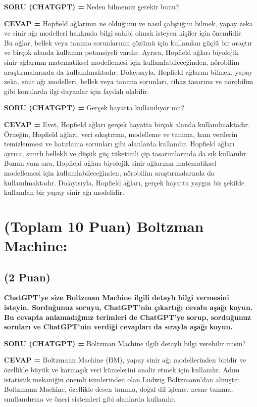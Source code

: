 \documentclass[11pt]{article}
\begin{document}
\textbf{SORU (CHATGPT) =} Neden bilmemiz gerekir bunu? 

\textbf{CEVAP =} Hopfield ağlarının ne olduğunu ve nasıl çalıştığını bilmek, yapay zeka ve sinir ağı modelleri hakkında bilgi sahibi olmak isteyen kişiler için önemlidir. Bu ağlar, bellek veya tanıma sorunlarının çözümü için kullanılan güçlü bir araçtır ve birçok alanda kullanım potansiyeli vardır. Ayrıca, Hopfield ağları biyolojik sinir ağlarının matematiksel modellemesi için kullanılabileceğinden, nörobilim araştırmalarında da kullanılmaktadır. Dolayısıyla, Hopfield ağlarını bilmek, yapay zeka, sinir ağı modelleri, bellek veya tanıma sorunları, cihaz tasarımı ve nörobilim gibi konularda ilgi duyanlar için faydalı olabilir.

\textbf{SORU (CHATGPT) =} Gerçek hayatta kullanılıyor mu?

\textbf{CEVAP =} Evet, Hopfield ağları gerçek hayatta birçok alanda kullanılmaktadır. Örneğin, Hopfield ağları, veri sıkıştırma, modelleme ve tanıma, ham verilerin temizlenmesi ve hatırlama sorunları gibi alanlarda kullanılır. Hopfield ağları ayrıca, sınırlı bellekli ve düşük güç tüketimli çip tasarımlarında da sık kullanılır. Bunun yanı sıra, Hopfield ağları biyolojik sinir ağlarının matematiksel modellemesi için kullanılabileceğinden, nörobilim araştırmalarında da kullanılmaktadır. Dolayısıyla, Hopfield ağları, gerçek hayatta yaygın bir şekilde kullanılan bir yapay sinir ağı modelidir.


\section{(Toplam 10 Puan) Boltzman Machine:}

\subsection{(2 Puan)} \textbf{ChatGPT’ye size Boltzman Machine ilgili detaylı bilgi vermesini isteyin. Sorduğunuz soruyu, ChatGPT'nin çıkartığı cevabı aşağı koyun. Bu cevapta anlamadığınız terimleri de ChatGPT’ye sorup, sorduğunuz soruları ve ChatGPT’nin verdiği cevapları da sırayla aşağı koyun.}

\textbf{SORU (CHATGPT) =} Boltzman Machine ilgili detaylı bilgi verebilir misin?

\textbf{CEVAP =} Boltzmann Machine (BM), yapay sinir ağı modellerinden biridir ve özellikle büyük ve karmaşık veri kümelerini analiz etmek için kullanılır. Adını istatistik mekaniğin önemli isimlerinden olan Ludwig Boltzmann'dan almıştır. Boltzmann Machine, özellikle desen tanıma, doğal dil işleme, nesne tanıma, sınıflandırma ve öneri sistemleri gibi alanlarda kullanılır.
\end{document}
